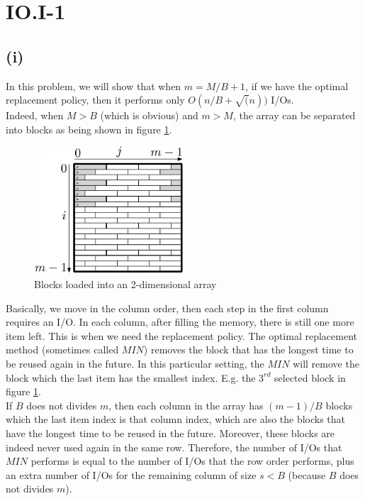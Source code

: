\section*{IO.I-1}
\subsection*{(i)}
In this problem, we will show that when $m = M/B + 1$, if we have the optimal replacement policy, then it performs only $O(n/B + \sqrt(n))$ I/Os.\\

Indeed, when $M > B$ (which is obvious) and $m > M$, the array can be separated into blocks as being shown in figure \ref{fig:row-major}. \\

\begin{figure}
  \centering
  \includegraphics[width=0.5\textwidth]{row-major}
  \caption{Blocks loaded into an 2-dimensional array}
  \label{fig:row-major}
\end{figure}

Basically, we move in the column order, then each step in the first column requires an I/O. In each column, after filling the memory, there is still one more item left. This is when we need the replacement policy. The optimal replacement method (sometimes called $MIN$) removes the block that has the longest time to be reused again in the future. In this particular setting, the $MIN$ will remove the block which the last item has the smallest index. E.g. the $3^{rd}$ selected block in figure \ref{fig:row-major}.\\

If $B$ does not divides $m$, then each column in the array has $(m - 1) / B$ blocks which the last item index is that column index, which are also the blocks that have the longest time to be reused in the future. Moreover, these blocks are indeed never used again in the same row. Therefore, the number of I/Os that $MIN$ performs is equal to the number of I/Os that the row order performs, plus an extra number of I/Os for the remaining column of size $s < B$ (because $B$ does not divides $m$).\\

